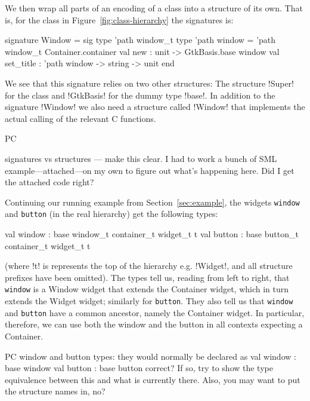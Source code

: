 \documentclass[workingdraft]{usetex-v1}
\begin{document}
We then wrap all parts of an encoding of a class into a structure of
its own.  That is, for the class  in
Figure~\ref{fig:class-hierarchy} the \sml signatures is:
\begin{SMLcode}
signature Window =
sig
  type 'path window_t
  type 'path window = 
         'path window_t Container.container
  val new : unit 
            -> GtkBasis.base window
  val set_title : 'path window -> string 
                                 -> unit
end
\end{SMLcode}
We see that this signature relies on two other structures:  The
structure !Super! for the class  and !GtkBasis! for
the dummy type !base!.  In addition to the signature !Window! we also
need a structure called !Window! that implements the actual calling of
the relevant \gtk C functions.

\begin{ednote}{PC}
  
signatures vs structures --- make this clear.  I had to work
a bunch of SML example---attached---on my own to figure out
what's happening here.  Did I get the attached code right?

\end{ednote}

Continuing our running example from Section~\ref{sec:example}, the
widgets \texttt{window} and \texttt{button} (in the real \gtk
hierarchy) get the following types:
\begin{SMLcode}
val window : 
     base window_t container_t widget_t t
val button : 
     base button_t container_t widget_t t
\end{SMLcode}
(where !t! is represents the top of the hierarchy e.g. !Widget!, and all
structure prefixes have been omitted).  The types tell us, reading from
left to right, that \texttt{window} is a Window widget that extends
the Container widget, which in turn extends the Widget widget;
similarly for \texttt{button}. They also tell us that \texttt{window}
and \texttt{button} have a common ancestor, namely the Container
widget.  In particular, therefore, we can use both the window and the
button in all contexts expecting a Container.

\begin{ednote}{PC}
  window and button types: they would normally be declared as
  val window : base window
  val button : base button
correct?  If so, try to show the type equivalence between
this and what is currently there.  Also, you may want to put
the structure names in, no?
\end{ednote}
\end{document}
